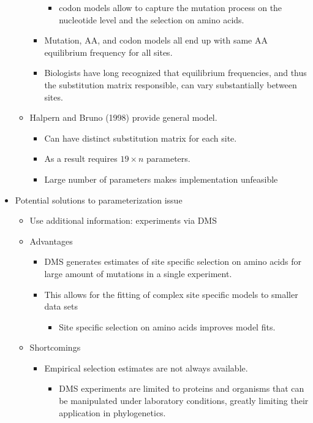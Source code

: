 \documentclass[12pt]{article}
\begin{document}
\begin{itemize}
\begin{itemize}
\begin{itemize}
\begin{itemize}
				\item codon models allow to capture the mutation process on the nucleotide level and the selection on amino acids.
			\end{itemize}
			\item Mutation, AA, and codon models all end up with same AA equilibrium frequency for all sites.
			\item Biologists have long recognized that equilibrium frequencies, and thus the substitution matrix responsible, can vary substantially between sites.
		\end{itemize}
		\item Halpern and Bruno (1998) provide general model.
		\begin{itemize}
			\item Can have distinct substitution matrix for each site.
			\item As a result requires $19 \times n$ parameters.
			\item Large number of parameters makes implementation unfeasible
		\end{itemize}
	\end{itemize}
	\item Potential solutions to parameterization issue
	\begin{itemize}
		\item Use additional information: experiments via DMS
		\item Advantages
		\begin{itemize}
			\item DMS generates estimates of site specific selection on amino acids for large amount of mutations in a single experiment.
			\item This allows for the fitting of complex site specific models to smaller data sets
			\begin{itemize}
				\item Site specific selection on amino acids improves model fits.
			\end{itemize}
		\end{itemize}
		\item Shortcomings
		\begin{itemize}
			\item Empirical selection estimates are not always available.
			\begin{itemize}
				\item DMS experiments are limited to proteins and organisms that can be manipulated under laboratory conditions, greatly limiting their application in phylogenetics.

\end{itemize}
\end{itemize}
\end{itemize}
\end{itemize}
\end{document}
